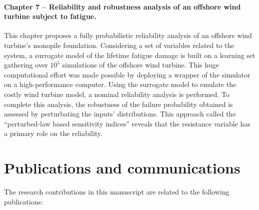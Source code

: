 \paragraph{Chapter 7 -- Reliability and robustness analysis of an offshore wind turbine subject to fatigue.} 
This chapter proposes a fully probabilistic reliability analysis of an offshore wind turbine's monopile foundation. 
Considering a set of variables related to the system, a surrogate model of the lifetime fatigue damage is built on a learning set gathering over $10^5$ simulations of the offshore wind turbine.  
This huge computational effort was made possible by deploying a wrapper of the simulator on a high-performance computer.   
Using the surrogate model to emulate the costly wind turbine model, a nominal reliability analysis is performed. 
To complete this analysis, the robustness of the failure probability obtained is assessed by perturbating the inputs' distributions. 
This approach called the ``perturbed-law based sensitivity indices'' \citep{lemaitre_2015_PLI} reveals that the resistance variable has a primary role on the reliability. 


\clearpage

\section*{Publications and communications}

The research contributions in this manuscript are related to the following publications: 

